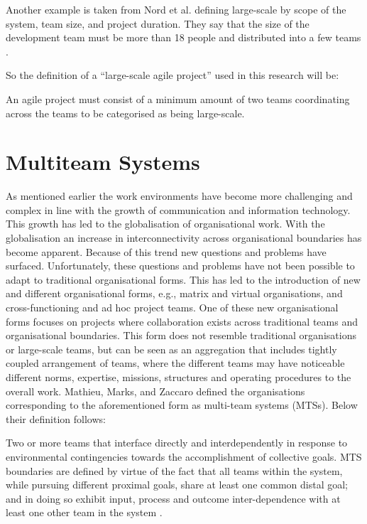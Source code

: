 Another example is taken from Nord et al. defining large-scale by scope of the system, team size, and project duration. They say that the size of the development team must be more than 18 people and distributed into a few teams \cite{Robert2014}.

So the definition of a ``large-scale agile project'' used in this research will be:

\begin{fancyquotes}
An agile project must consist of a minimum amount of two teams coordinating across the teams to be categorised as being large-scale.
\end{fancyquotes}

\textbf{ }

\section{Multiteam Systems}

As mentioned earlier the work environments have become more challenging and complex in line with the growth of communication and information technology. This growth has led to the globalisation of organisational work. With the globalisation an increase in interconnectivity across organisational boundaries has become apparent. Because of this trend new questions and problems have surfaced. Unfortunately, these questions and problems have not been possible to adapt to traditional organisational forms. This has led to the introduction of new and different organisational forms, e.g., matrix and virtual organisations, and cross-functioning and ad hoc project teams. One of these new organisational forms focuses on projects where collaboration exists across traditional teams and organisational boundaries. This form does not resemble traditional organisations or large-scale teams, but can be seen as an aggregation that includes tightly coupled arrangement of teams, where the different teams may have noticeable different norms, expertise, missions, structures and operating procedures to the overall work. Mathieu, Marks, and Zaccaro \cite{Mathieu2001} defined the organisations corresponding to the aforementioned form as multi-team systems (MTSs). Below their definition follows:

\begin{fancyquotes}
Two or more teams that interface directly and interdependently in response to environmental contingencies towards the accomplishment of collective goals. MTS boundaries are defined by virtue of the fact that all teams within the system, while pursuing different proximal goals, share at least one common distal goal; and in doing so exhibit input, process and outcome inter-dependence with at least one other team in the system \cite{Mathieu2001}.
\end{fancyquotes}

